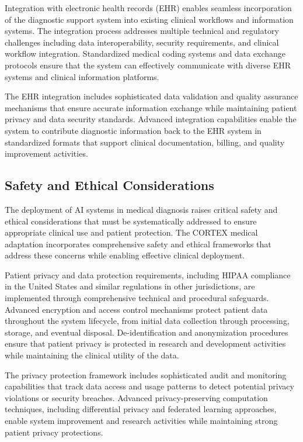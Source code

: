 Integration with electronic health records (EHR) enables seamless incorporation of the diagnostic support system into existing clinical workflows and information systems. The integration process addresses multiple technical and regulatory challenges including data interoperability, security requirements, and clinical workflow integration. Standardized medical coding systems and data exchange protocols ensure that the system can effectively communicate with diverse EHR systems and clinical information platforms.

The EHR integration includes sophisticated data validation and quality assurance mechanisms that ensure accurate information exchange while maintaining patient privacy and data security standards. Advanced integration capabilities enable the system to contribute diagnostic information back to the EHR system in standardized formats that support clinical documentation, billing, and quality improvement activities.

\subsection{Safety and Ethical Considerations}

The deployment of AI systems in medical diagnosis raises critical safety and ethical considerations that must be systematically addressed to ensure appropriate clinical use and patient protection. The CORTEX medical adaptation incorporates comprehensive safety and ethical frameworks that address these concerns while enabling effective clinical deployment.

Patient privacy and data protection requirements, including HIPAA compliance in the United States and similar regulations in other jurisdictions, are implemented through comprehensive technical and procedural safeguards. Advanced encryption and access control mechanisms protect patient data throughout the system lifecycle, from initial data collection through processing, storage, and eventual disposal. De-identification and anonymization procedures ensure that patient privacy is protected in research and development activities while maintaining the clinical utility of the data.

The privacy protection framework includes sophisticated audit and monitoring capabilities that track data access and usage patterns to detect potential privacy violations or security breaches. Advanced privacy-preserving computation techniques, including differential privacy and federated learning approaches, enable system improvement and research activities while maintaining strong patient privacy protections.

